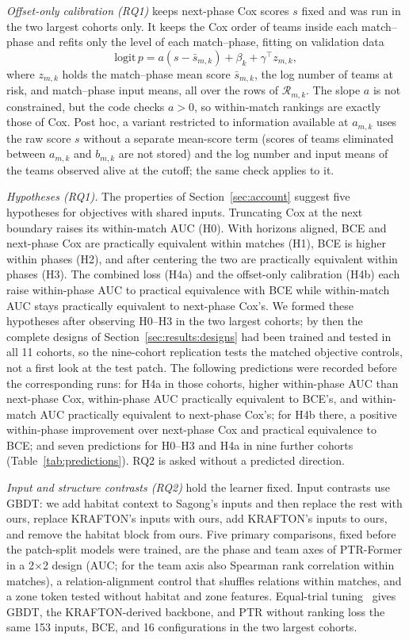 \documentclass[sigconf,anonymous]{acmart}
\begin{document}
\emph{Offset-only calibration (RQ1)} keeps next-phase Cox scores $s$ fixed and was run in the two largest cohorts only. It keeps the Cox order of teams inside each match--phase and refits only the level of each match--phase, fitting on validation data
\begin{equation}
\mathrm{logit}\,p=a(s-\bar s_{m,k})+\beta_k+\gamma^{\top}z_{m,k},
\label{eq:offset}
\end{equation}
where $z_{m,k}$ holds the match--phase mean score $\bar s_{m,k}$, the log number of teams at risk, and match--phase input means, all over the rows of $\mathcal{R}_{m,k}$. The slope $a$ is not constrained, but the code checks $a>0$, so within-match rankings are exactly those of Cox. Post hoc, a variant restricted to information available at $a_{m,k}$ uses the raw score $s$ without a separate mean-score term (scores of teams eliminated between $a_{m,k}$ and $b_{m,k}$ are not stored) and the log number and input means of the teams observed alive at the cutoff; the same check applies to it.

\emph{Hypotheses (RQ1).} The properties of Section~\ref{sec:account} suggest five hypotheses for objectives with shared inputs. Truncating Cox at the next boundary raises its within-match AUC (H0). With horizons aligned, BCE and next-phase Cox are practically equivalent within matches (H1), BCE is higher within phases (H2), and after centering the two are practically equivalent within phases (H3). The combined loss (H4a) and the offset-only calibration (H4b) each raise within-phase AUC to practical equivalence with BCE while within-match AUC stays practically equivalent to next-phase Cox's. We formed these hypotheses after observing H0--H3 in the two largest cohorts; by then the complete designs of Section~\ref{sec:results:designs} had been trained and tested in all 11 cohorts, so the nine-cohort replication tests the matched objective controls, not a first look at the test patch. The following predictions were recorded before the corresponding runs: for H4a in those cohorts, higher within-phase AUC than next-phase Cox, within-phase AUC practically equivalent to BCE's, and within-match AUC practically equivalent to next-phase Cox's; for H4b there, a positive within-phase improvement over next-phase Cox and practical equivalence to BCE; and seven predictions for H0--H3 and H4a in nine further cohorts (Table~\ref{tab:predictions}). RQ2 is asked without a predicted direction.

\emph{Input and structure contrasts (RQ2)} hold the learner fixed. Input contrasts use GBDT: we add habitat context to Sagong's inputs and then replace the rest with ours, replace KRAFTON's inputs with ours, add KRAFTON's inputs to ours, and remove the habitat block from ours. Five primary comparisons, fixed before the patch-split models were trained, are the phase and team axes of PTR-Former in a 2$\times$2 design (AUC; for the team axis also Spearman rank correlation within matches), a relation-alignment control that shuffles relations within matches, and a zone token tested without habitat and zone features. Equal-trial tuning~\cite{Bergstra12,Cawley10} gives GBDT, the KRAFTON-derived backbone, and PTR without ranking loss the same 153 inputs, BCE, and 16 configurations in the two largest cohorts.
\end{document}
